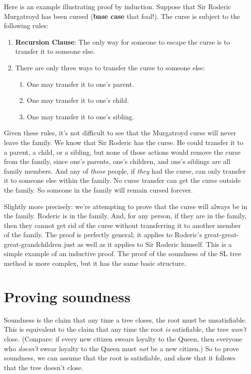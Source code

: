 Here is an example illustrating proof by induction. Suppose that Sir Roderic Murgatroyd has been cursed (\textbf{base case} that fool!). The curse is subject to the following rules:

\begin{enumerate}
	\item \textbf{Recursion Clause}: The only way for someone to escape the curse is to transfer it to someone else.
	\item There are only three ways to transfer the curse to someone else:
		\begin{enumerate}
			\item One may transfer it to one's parent.
			\item One may transfer it to one's child.
			\item One may transfer it to one's sibling.
		\end{enumerate}
\end{enumerate}

Given these rules, it's not difficult to see that the Murgatroyd curse will never leave the family. We know that Sir Roderic has the curse. He could transfer it to a parent, a child, or a sibling, but none of those actions would remove the curse from the family, since one's parents, one's children, and one's siblings are all family members. And any of \emph{those} people, if \emph{they} had the curse, can only transfer it to someone else within the family. No curse transfer can get the curse outside the family. So someone in the family will remain cursed forever.

Slightly more precisely: we're attempting to prove that the curse will always be in the family. Roderic is in the family. And, for any person, if they are in the family, then they cannot get rid of the curse without transferring it to another member of the family. The proof is perfectly general; it applies to Roderic's great-great-great-grandchildren just as well as it applies to Sir Roderic himself. This is a simple example of an inductive proof. The proof of the soundness of the SL tree method is more complex, but it has the same basic structure.

\section{Proving soundness}

Soundness is the claim that any time a tree closes, the root must be unsatisfiable. This is equivalent to the claim that any time the root \emph{is} satisfiable, the tree \emph{won't} close. (Compare: if every new citizen swears loyalty to the Queen, then everyone who \emph{doesn't} swear loyalty to the Queen must \emph{not} be a new citizen.) So to prove soundness, we can assume that the root is satisfiable, and show that it follows that the tree doesn't close.

